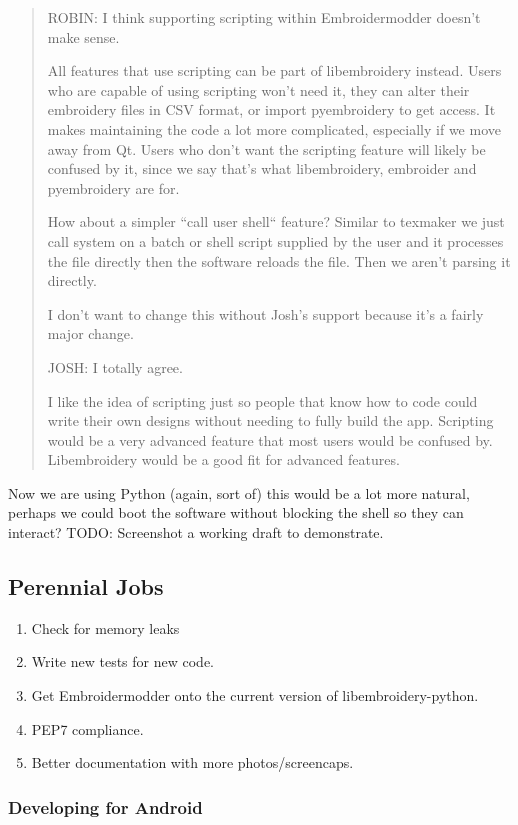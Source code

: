 \documentclass[a4paper, 11pt]{report}
\begin{document}
\begin{quote}
ROBIN: I think supporting scripting within Embroidermodder doesn't make sense.

All features that use scripting can be part of libembroidery instead.
Users who are capable of using scripting won't need it, they can alter their embroidery files in CSV format, or import pyembroidery to get access.
It makes maintaining the code a lot more complicated, especially if we move away from Qt.
Users who don't want the scripting feature will likely be confused by it, since we say that's what libembroidery, embroider and pyembroidery are for.

How about a simpler ``call user shell`` feature? Similar to texmaker we just call system on a batch or shell script supplied by the user and it processes the file directly then the software reloads the file. Then we aren't parsing it directly.

I don't want to change this without Josh's support because it's a fairly major change.

JOSH: I totally agree.

I like the idea of scripting just so people that know how to code could write their own designs without needing to fully build the app. Scripting would be a very advanced feature that most users would be confused by. Libembroidery would be a good fit for advanced features.
\end{quote}

Now we are using Python (again, sort of) this would be a lot more natural,
perhaps we could boot the software without blocking the shell so they can
interact? TODO: Screenshot a working draft to demonstrate.

\subsection{Perennial Jobs}

\begin{enumerate}
\item Check for memory leaks
\item Write new tests for new code.
\item Get Embroidermodder onto the current version of libembroidery-python.
\item PEP7 compliance.
\item Better documentation with more photos/screencaps.
\end{enumerate}

\subsubsection{Developing for Android}
\end{document}
